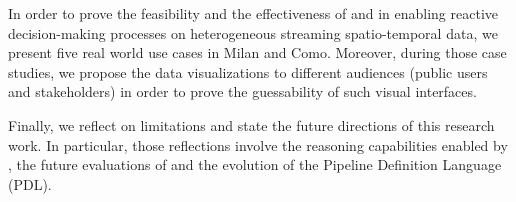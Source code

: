 In order to prove the feasibility and the effectiveness of \frappe{} and \river{} in enabling reactive decision-making processes on heterogeneous streaming spatio-temporal data, we present five real world use cases in Milan and Como.
Moreover, during those case studies, we propose the data visualizations to different audiences (public users and stakeholders) in order to prove the guessability of such visual interfaces.

Finally, we reflect on limitations and state the future directions of this research work.
In particular, those reflections involve the reasoning capabilities enabled by \frappe{}, the future evaluations of \river{} and the evolution of the Pipeline Definition Language (PDL).



